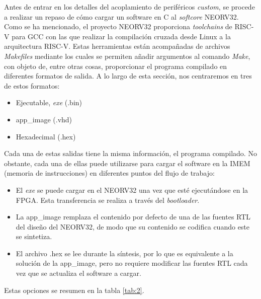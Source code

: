 Antes de entrar en los detalles del acoplamiento de periféricos \textit{custom}, se procede a realizar un repaso de cómo cargar un software en C al \textit{softcore} NEORV32.
Como se ha mencionado, el proyecto NEORV32 proporciona \textit{toolchains} de RISC-V para GCC con las que realizar la compilación cruzada desde Linux a la arquitectura RISC-V.
Estas herramientas están acompañadas de archivos \textit{Makefiles} mediante los cuales se permiten añadir argumentos al comando \textit{Make}, con objeto de, entre otras cosas, proporcionar el programa compilado en diferentes formatos de salida.
A lo largo de esta sección, nos centraremos en tres de estos formatos:

\begin{itemize}
    \item Ejecutable, \textit{exe} (.bin)
    \item app\_image (.vhd)
    \item Hexadecimal (.hex)
\end{itemize} 

Cada una de estas salidas tiene la misma información, el programa compilado.
No obstante, cada una de ellas puede utilizarse para cargar el software en la IMEM (memoria de instrucciones) en diferentes puntos del flujo de trabajo:

\begin{itemize}
    \item El \textit{exe} se puede cargar en el NEORV32 una vez que esté ejecutándose en la FPGA. Esta transferencia se realiza a través del \textit{bootloader}.
    \item La app\_image remplaza el contenido por defecto de una de las fuentes RTL del diseño del NEORV32, de modo que su contenido se codifica cuando este se sintetiza.
    \item El archivo .hex se lee durante la síntesis, por lo que es equivalente a la solución de la app\_image, pero no requiere modificar las fuentes RTL cada vez que se actualiza el software a cargar.
\end{itemize} 

Estas opciones se resumen en la tabla \ref{tab:2}.

